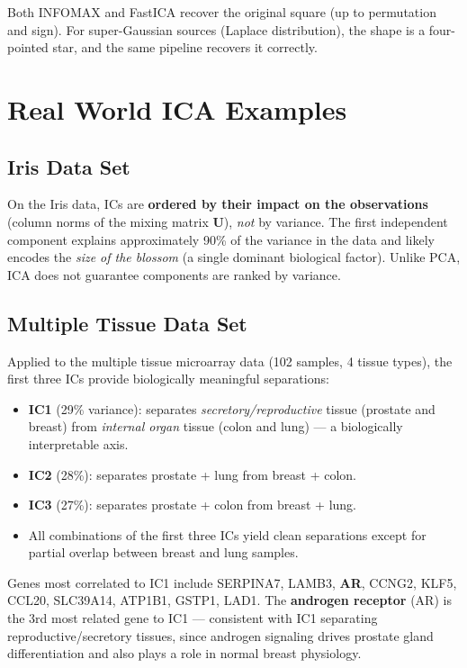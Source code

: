 \documentclass[11pt, oneside]{book}
\begin{document}
Both INFOMAX and FastICA recover the original square (up to permutation and sign).
For super-Gaussian sources (Laplace distribution), the shape is a four-pointed star,
and the same pipeline recovers it correctly.


\section{Real World ICA Examples}

\subsection{Iris Data Set}

On the Iris data, ICs are \textbf{ordered by their impact on the observations}
(column norms of the mixing matrix $\bm{U}$), \emph{not} by variance.
The first independent component explains approximately 90\% of the variance in the
data and likely encodes the \emph{size of the blossom} (a single dominant biological
factor).
Unlike PCA, ICA does not guarantee components are ranked by variance.

\subsection{Multiple Tissue Data Set}

Applied to the multiple tissue microarray data (102 samples, 4 tissue types), the
first three ICs provide biologically meaningful separations:
\begin{itemize}
  \item \textbf{IC1} (29\% variance): separates \emph{secretory/reproductive} tissue
        (prostate and breast) from \emph{internal organ} tissue (colon and lung) ---
        a biologically interpretable axis.
  \item \textbf{IC2} (28\%): separates prostate + lung from breast + colon.
  \item \textbf{IC3} (27\%): separates prostate + colon from breast + lung.
  \item All combinations of the first three ICs yield clean separations except for
        partial overlap between breast and lung samples.
\end{itemize}
Genes most correlated to IC1 include SERPINA7, LAMB3, \textbf{AR}, CCNG2, KLF5, CCL20,
SLC39A14, ATP1B1, GSTP1, LAD1.
The \textbf{androgen receptor} (AR) is the 3rd most related gene to IC1 --- consistent
with IC1 separating reproductive/secretory tissues, since androgen signaling drives
prostate gland differentiation and also plays a role in normal breast physiology.
\end{document}

